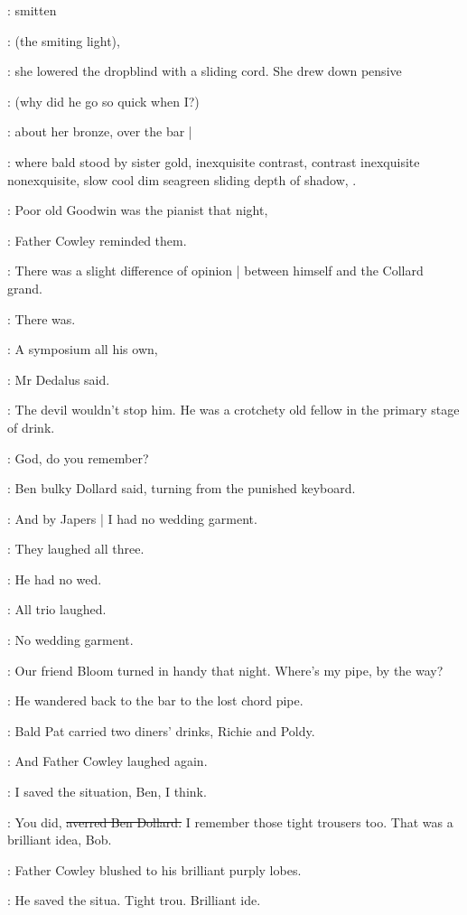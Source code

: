 :
smitten

\MissDInt:
(the smiting light),

:
she lowered the dropblind with a sliding cord.
She drew down pensive

\MissDInt:
(why did he go so quick when I?)

:
about her bronze,
over the bar |

:
where bald stood by sister gold,
inexquisite contrast,
contrast inexquisite nonexquisite,
slow cool dim seagreen sliding depth of shadow,
.

\cowley:
Poor old Goodwin was the pianist that night,

:
Father Cowley reminded them.

\cowley:
There was a slight difference of opinion |
between himself and the Collard grand.

:
There was.

\simon:
A symposium all his own,

:
Mr Dedalus said.

\simon:
The devil wouldn't stop him.
He was a crotchety old fellow
in the primary stage of drink.

\dollard:
God,
do you remember?

:
Ben bulky Dollard said,
turning from the punished keyboard.

\dollard:
And by Japers |
I had no wedding garment.

:
They laughed all three.

\simon:
He had no wed.

:
All trio laughed.

\dollard:
No wedding garment.

\simon:
Our friend Bloom turned in handy that night.
Where's my pipe,
by the way?

:
He wandered back to the bar to the lost chord pipe.

:
Bald Pat carried
two diners' drinks,
Richie and Poldy.

:
And Father Cowley laughed again.

\cowley:
I saved the situation,
Ben,
I think.

\dollard:
You did,
\sout{averred Ben Dollard.}
I remember those tight trousers too.
That was a brilliant idea,
Bob.

:
Father Cowley blushed to his brilliant purply lobes.

:
He saved the situa.
Tight trou.
Brilliant ide.

